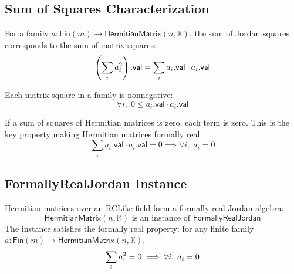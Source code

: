 \subsection{Sum of Squares Characterization}

\begin{theorem}
For a family $a : \mathsf{Fin}(m) \to \mathsf{HermitianMatrix}(n, \mathbb{K})$, the sum of Jordan squares corresponds to the sum of matrix squares:
\[ \left(\sum_{i} a_i^{2}\right).\mathsf{val} = \sum_{i} a_i.\mathsf{val} \cdot a_i.\mathsf{val} \]
\end{theorem}

\begin{lemma}
Each matrix square in a family is nonnegative:
\[ \forall i,\; 0 \le a_i.\mathsf{val} \cdot a_i.\mathsf{val} \]
\end{lemma}

\begin{theorem}
If a sum of squares of Hermitian matrices is zero, each term is zero. This is the key property making Hermitian matrices formally real:
\[ \sum_{i} a_i.\mathsf{val} \cdot a_i.\mathsf{val} = 0 \implies \forall i,\; a_i = 0 \]
\end{theorem}

\subsection{FormallyRealJordan Instance}

\begin{proposition}[formallyRealJordanHermitianMatrix]
Hermitian matrices over an RCLike field form a formally real Jordan algebra:
\[ \mathsf{HermitianMatrix}(n, \mathbb{K}) \text{ is an instance of } \mathsf{FormallyRealJordan} \]
The instance satisfies the formally real property: for any finite family $a : \mathsf{Fin}(m) \to \mathsf{HermitianMatrix}(n, \mathbb{K})$,
\[ \sum_{i} a_i^{2} = 0 \implies \forall i,\; a_i = 0 \]
\end{proposition}

